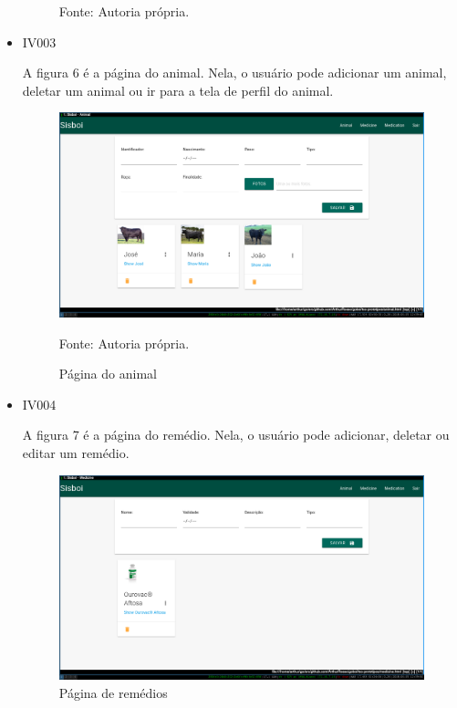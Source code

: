 \begin{itemize}
\begin{figure}[H]
\begin{center}
		Fonte: Autoria própria.
	\end{center}
\end{figure}

\newpage
\item IV003

A figura 6 é a página do animal. Nela, o usuário pode adicionar um animal, deletar um animal ou ir para a tela de perfil do animal.
\begin{figure}[H]
	\begin{center}
		\caption{Página do animal}
		\includegraphics[width=13cm]{../img/prototipos/animal.png}

		Fonte: Autoria própria.
	\end{center}
\end{figure}

\item IV004

A figura 7 é a página do remédio. Nela, o usuário pode adicionar, deletar ou editar um remédio.
\begin{figure}[H]
	\begin{center}
		\caption{Página de remédios}
		\includegraphics[width=13cm]{../img/prototipos/remedio.png}


\end{center}
\end{figure}
\end{itemize}
